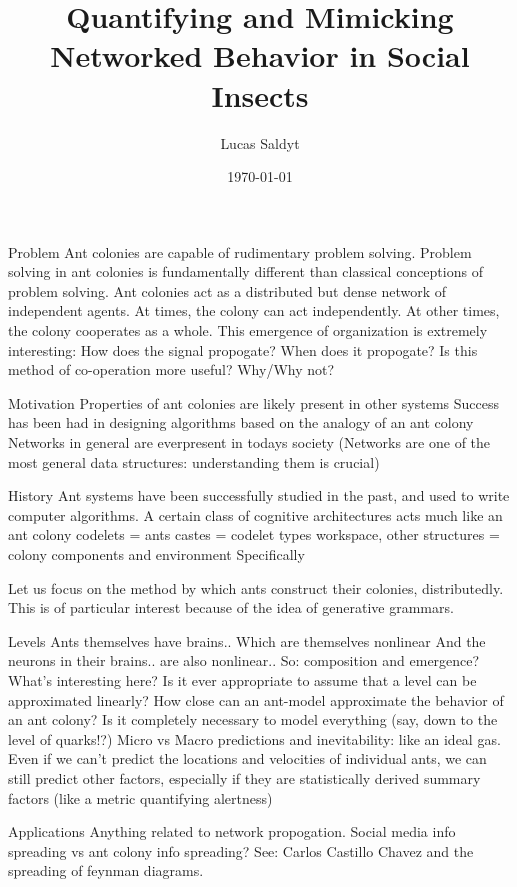 \documentclass{beamer}
\title{Quantifying and Mimicking Networked Behavior in Social Insects}
\date{\today}
\author{Lucas Saldyt}
\institute{Arizona State University}
\begin{document}
  \maketitle
  \begin{frame}{Problem}
      Ant colonies are capable of rudimentary problem solving.
      Problem solving in ant colonies is fundamentally different than classical conceptions of problem solving.
      Ant colonies act as a distributed but dense network of independent agents.
      At times, the colony can act independently.
      At other times, the colony cooperates as a whole.
      This emergence of organization is extremely interesting:
      How does the signal propogate?
      When does it propogate?
      Is this method of co-operation more useful? Why/Why not?
       
  \end{frame}
  \begin{frame}{Motivation}
      Properties of ant colonies are likely present in other systems
      Success has been had in designing algorithms based on the analogy of an ant colony
      Networks in general are everpresent in todays society
      (Networks are one of the most general data structures: understanding them is crucial)
  \end{frame}

  \begin{frame}{History}
      Ant systems have been successfully studied in the past, and used to write computer algorithms.
      A certain class of cognitive architectures acts much like an ant colony
      codelets = ants
      castes = codelet types
      workspace, other structures = colony components and environment
      Specifically

      Let us focus on the method by which ants construct their colonies, distributedly.
      This is of particular interest because of the idea of generative grammars.
  \end{frame}

  \begin{frame}{Levels}
      Ants themselves have brains..
      Which are themselves nonlinear
      And the neurons in their brains.. are also nonlinear..
      So: composition and emergence? What's interesting here?
      Is it ever appropriate to assume that a level can be approximated linearly? 
      How close can an ant-model approximate the behavior of an ant colony?
      Is it completely necessary to model everything (say, down to the level of quarks!?)
      Micro vs Macro predictions and inevitability: like an ideal gas.
      Even if we can't predict the locations and velocities of individual ants, we can still predict other factors, especially if they are statistically derived summary factors (like a metric quantifying alertness)
  \end{frame}

  \begin{frame}{Applications}
      Anything related to network propogation.
      Social media info spreading vs ant colony info spreading?
      See: Carlos Castillo Chavez and the spreading of feynman diagrams.

  \end{frame}
\end{document}
